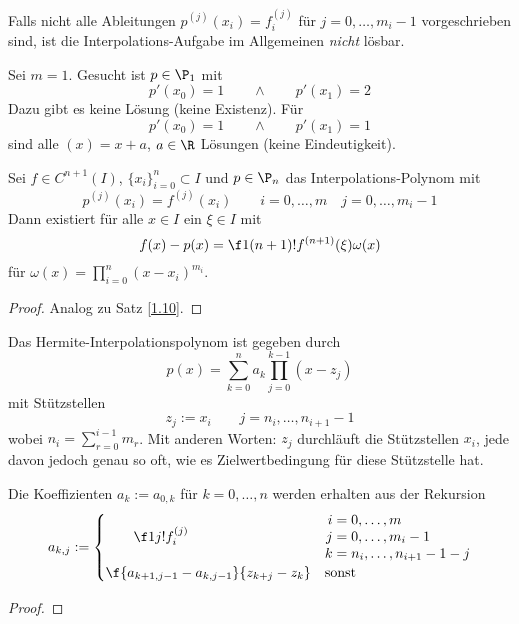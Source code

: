\documentclass[11pt]{scrbook}
\begin{document}
\begin{note}
	Falls nicht alle Ableitungen $p^{(j)}(x_i) =f_i^{(j)}$ für $j=0,\dotsc,m_i-1$ vorgeschrieben sind, ist die Interpolations-Aufgabe im Allgemeinen \emph{nicht} lösbar.

	\begin{ex*}
		Sei $m=1$.
		Gesucht ist $p\in \P_1$ mit
		\[
			p'(x_0) = 1 \qquad \land \qquad p'(x_1) = 2
		\]
		Dazu gibt es keine Lösung (keine Existenz).
		Für
		\[
			p'(x_0) = 1 \qquad \land \qquad p'(x_1) = 1
		\]
		sind alle $(x) = x+a$, $a\in \R$ Lösungen (keine Eindeutigkeit).
	\end{ex*}
\end{note}

\begin{st}[Fehlerdarstellung]
	\label{1.20}
	Sei $f\in C^{n+1}(I)$, $\{x_i\}_{i=0}^n\subset I$ und $p\in \P_n$ das Interpolations-Polynom mit
	\[
		p^{(j)}(x_i) = f^{(j)}(x_i) \qquad i=0,\dotsc,m \quad j=0,\dotsc,m_i-1
	\]
	Dann existiert für alle $x\in I$ ein $\xi \in I$ mit
	\[
		f(x) - p(x) = \f 1{(n+1)!} f^{(n+1)} (\xi) \omega(x)
	\]
	für $\omega(x) = \prod_{i=0}^n(x-x_i)^{m_i}$.
	\begin{proof}
		Analog zu Satz \ref{1.10}.
	\end{proof}
\end{st}

\begin{st}
	\label{1.21}	
	Das Hermite-Interpolationspolynom ist gegeben durch
	\[
		p(x) = \sum_{k=0}^n a_k \prod_{j=0}^{k-1}(x-z_j)
	\]
	mit Stützstellen
	\[
		z_j := x_i \qquad j=n_{i},\dotsc, n_{i+1}-1
	\]
	wobei $n_i = \sum_{r=0}^{i-1}m_r$.
	Mit anderen Worten: $z_j$ durchläuft die Stützstellen $x_i$, jede davon jedoch genau so oft, wie es Zielwertbedingung für diese Stützstelle hat.

	Die Koeffizienten $a_k := a_{0,k}$ für $k=0,\dotsc,n$ werden erhalten aus der Rekursion
	\begin{align*}
		a_{k,j} := \begin{cases}
			\displaystyle \qquad \f 1{j!}f_i^{(j)} 			&  \begin{aligned}i&=0,\dotsc,m \\ j&=0,\dotsc,m_i-1 \\ k&=n_{i},\dotsc, n_{i+1}-1-j\end{aligned} \\
			\displaystyle \f {a_{k+1,j-1} - a_{k,j-1}}{z_{k+j} - z_k} & \text{sonst}
		\end{cases}
	\end{align*}
	\begin{proof}
	\end{proof}
\end{st}
\end{document}
